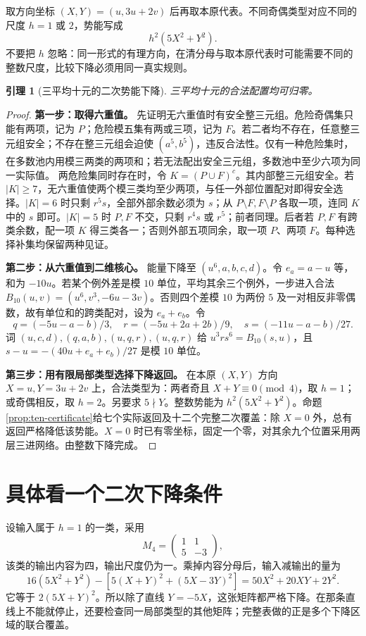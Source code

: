 \documentclass[11pt,a4paper,oneside,openany]{book}
\newtheorem{lemma}[theorem]{引理}
\theoremstyle{definition}
\numberwithin{equation}{chapter}
\begin{document}
取方向坐标 $(X,Y)=(u,3u+2v)$ 后再取本原代表。不同奇偶类型对应不同的尺度 $h=1$ 或 $2$，势能写成
\[h^2(5X^2+Y^2).
\]
不要把 $h$ 忽略：同一形式的有理方向，在清分母与取本原代表时可能需要不同的整数尺度，比较下降必须用同一真实规则。
\begin{lemma}[三平均十元的二次势能下降]\label{lem:ten}
三平均十元的合法配置均可归零。
\end{lemma}
\begin{proof}

\par\noindent\textbf{第一步：取得六重值。}
先证明无六重值时有安全整三元组。危险奇偶集只能有两项，记为 $P$；危险模五集有两或三项，记为 $F$。若二者均不存在，任意整三元组安全；不存在整三元组会迫使 $(a^5,b^5)$，违反合法性。仅有一种危险集时，在多数池内用模三两类的两项和；若无法配出安全三元组，多数池中至少六项为同一实际值。
两危险集同时存在时，令 $K=(P\cup F)^c$。其内部整三元组安全。若 $|K|\ge7$，无六重值使两个模三类均至少两项，与任一外部位置配对即得安全选择。$|K|=6$ 时只剩 $r^5s$，全部外部余数必须为 $s$；从 $P\setminus F,F\setminus P$ 各取一项，连同 $K$ 中的 $s$ 即可。$|K|=5$ 时 $P,F$ 不交，只剩 $r^4s$ 或 $r^5$；前者同理。后者若 $P,F$ 有跨类余数，配一项 $K$ 得三类各一；否则外部五项同余，取一项 $P$、两项 $F$。每种选择补集均保留两种见证。


\par\noindent\textbf{第二步：从六重值到二维核心。}
能量下降至 $(u^6,a,b,c,d)$。令 $e_a=a-u$ 等，和为 $-10u$。若某个例外差是模 $10$ 单位，平均其余三个例外，一步进入合法 $B_{10}(u,v)=(u^6,v^3,-6u-3v)$。否则四个差模 $10$ 为两份 $5$ 及一对相反非零偶数，故有单位和的跨类配对，设为 $e_a+e_b$。令
\[q=(-5u-a-b)/3,\quad r=(-5u+2a+2b)/9,\quad s=(-11u-a-b)/27.
\]
词 $(u,c,d),(q,a,b),(u,q,r),(u,q,r)$ 给 $u^3r s^6=B_{10}(s,u)$，且 $s-u=-(40u+e_a+e_b)/27$ 是模 $10$ 单位。


\par\noindent\textbf{第三步：用有限局部类型选择下降返回。}
在本原 $(X,Y)$ 方向 $X=u,Y=3u+2v$ 上，合法类型为：两者奇且 $X+Y\equiv0\pmod4$，取 $h=1$；或奇偶相反，取 $h=2$。另要求 $5\nmid Y$。整数势能为 $h^2(5X^2+Y^2)$。命题\ref{prop:ten-certificate}给七个实际返回及十二个完整二次覆盖：除 $X=0$ 外，总有返回严格降低该势能。$X=0$ 时已有零坐标，固定一个零，对其余九个位置采用两层三进网络。由整数下降完成。
\end{proof}

\section{具体看一个二次下降条件}
设输入属于 $h=1$ 的一类，采用
\[M_4=\begin{pmatrix}1&1\\5&-3\end{pmatrix},
\]
该类的输出内容为四，输出尺度仍为一。乘掉内容分母后，输入减输出的量为
\[
16(5X^2+Y^2)-[5(X+Y)^2+(5X-3Y)^2]
=50X^2+20XY+2Y^2.
\]
它等于 $2(5X+Y)^2$。所以除了直线 $Y=-5X$，这张矩阵都严格下降。在那条直线上不能就停止，还要检查同一局部类型的其他矩阵；完整表做的正是多个下降区域的联合覆盖。
\end{document}
